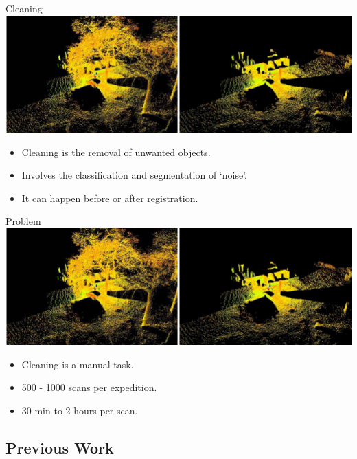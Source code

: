 \documentclass{beamer}
\begin{document}
\begin{frame}{Cleaning}
  \includegraphics[width=1\textwidth]{pics/cleaning.png}
  \begin{itemize}
  \item
  Cleaning is the removal of unwanted objects.
  \item
  Involves the classification and segmentation of `noise'.
  \item
  It can happen before or after registration.
  \end{itemize}
\end{frame}

\begin{frame}{Problem}
  \includegraphics[width=1\textwidth]{pics/cleaning.png}
  \begin{itemize}
  \item
  Cleaning is a manual task.
  \item
  500 - 1000 scans per expedition.
  \item
  30 min to 2 hours per scan.
  \end{itemize}
\end{frame}

\subsection{Previous Work}
\end{document}
